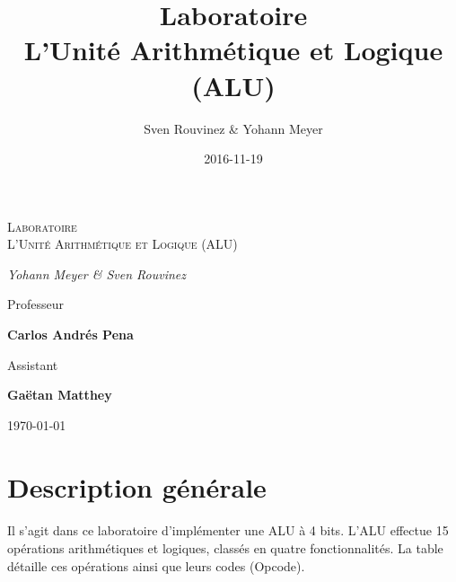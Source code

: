 \documentclass[a4paper]{article}
\title{\color{Monokaimagenta} \textbf{Laboratoire \\ L'Unité Arithmétique et Logique (ALU) }}
\author{Sven Rouvinez \& Yohann Meyer}
\date{2016-11-19}
\begin{document}
\maketitle

\begin{titlepage}
	\centering
	
	{\scshape\LARGE \color{Monokaimagenta} Laboratoire \\ L'Unité Arithmétique et Logique (ALU) \par}
	\vspace{1cm}
	
	{\Large\itshape Yohann Meyer \& Sven Rouvinez\par}
	\vfill
	Professeur\par
	\textbf{Carlos Andrés Pena}\par
	\vspace{1cm}
	Assistant\par
	\textbf{Gaëtan Matthey}
	
	\vfill

	{\large \today\par}
\end{titlepage}



\section{Description générale}
\paragraph{}
Il s’agit dans ce laboratoire d’implémenter une ALU à 4 bits. L’ALU effectue 15 opérations arithmétiques et logiques, classés en quatre fonctionnalités. La table détaille ces opérations ainsi que leurs codes (Opcode).
\end{document}
